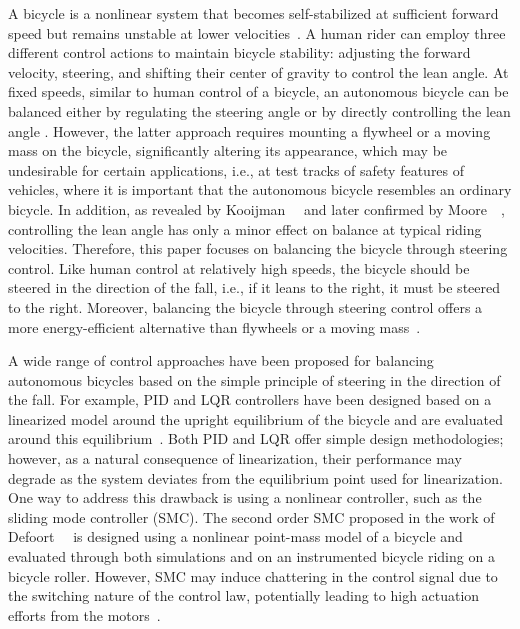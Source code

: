 A bicycle is a nonlinear system that becomes self-stabilized at sufficient forward speed but remains unstable at lower velocities~\cite{Meijaard2007}. A human rider can employ three different control actions to maintain bicycle stability: adjusting the forward velocity, steering, and shifting their center of gravity to control the lean angle. At fixed speeds, similar to human control of a bicycle, an autonomous bicycle can be balanced either by regulating the steering angle \cite{Yeh2024, PerssonECC, defoort2009sliding} or by directly controlling the lean angle \cite{zhang2014, wang2017tracking}. However, the latter approach requires mounting a flywheel or a moving mass on the bicycle, significantly altering its appearance, which may be undesirable for certain applications, i.e., at test tracks of safety features of vehicles, where it is important that the autonomous bicycle resembles an ordinary bicycle. In addition, as revealed by Kooijman~\etal~\cite{kooijman2009} and later confirmed by Moore~\etal~\cite{moore2011}, controlling the lean angle has only a minor effect on balance at typical riding velocities. Therefore, this paper focuses on balancing the bicycle through steering control. Like human control at relatively high speeds, the bicycle should be steered in the direction of the fall, i.e., if it leans to the right, it must be steered to the right. Moreover, balancing the bicycle through steering control offers a more energy-efficient alternative than flywheels or a moving mass~\cite{rodriguez2017improving}. 
 
A wide range of control approaches have been proposed for balancing autonomous bicycles based on the simple principle of steering in the direction of the fall. For example, PID and LQR controllers have been designed based on a linearized model around the upright equilibrium of the bicycle and are evaluated around this equilibrium~\cite{PerssonECC}. Both PID and LQR offer simple design methodologies; however, as a natural consequence of linearization, their performance may degrade as the system deviates from the equilibrium point used for linearization. One way to address this drawback is using a nonlinear controller, such as the sliding mode controller (SMC). The second order SMC proposed in the work of Defoort~\etal~\cite{defoort2009sliding} is designed using a nonlinear point-mass model of a bicycle and evaluated through both simulations and on an instrumented bicycle riding on a bicycle roller. However, SMC may induce chattering in the control signal due to the switching nature of the control law, potentially leading to high actuation efforts from the motors~\cite{slotine1991applied}. 

